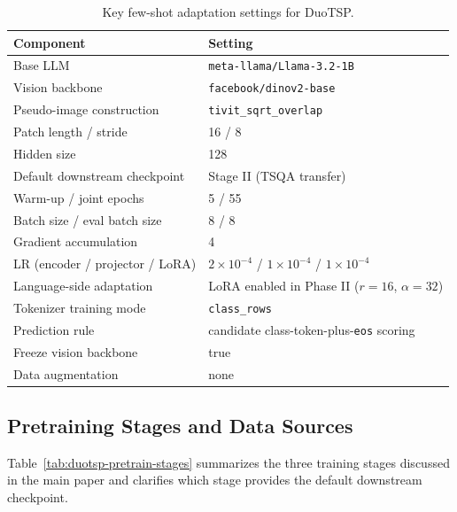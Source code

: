 \documentclass{article}
\begin{document}
\begin{table}[t]
\centering
\caption{Key few-shot adaptation settings for DuoTSP.}
\label{tab:duotsp-appendix-details}
\begin{tabular}{ll}
\toprule
Component & Setting \\
\midrule
Base LLM & \texttt{meta-llama/Llama-3.2-1B} \\
Vision backbone & \texttt{facebook/dinov2-base} \\
Pseudo-image construction & \texttt{tivit\_sqrt\_overlap} \\
Patch length / stride & 16 / 8 \\
Hidden size & 128 \\
Default downstream checkpoint & Stage II (TSQA transfer) \\
Warm-up / joint epochs & 5 / 55 \\
Batch size / eval batch size & 8 / 8 \\
Gradient accumulation & 4 \\
LR (encoder / projector / LoRA) & $2\times 10^{-4}$ / $1\times 10^{-4}$ / $1\times 10^{-4}$ \\
Language-side adaptation & LoRA enabled in Phase II ($r=16$, $\alpha=32$) \\
Tokenizer training mode & \texttt{class\_rows} \\
Prediction rule & candidate class-token-plus-\texttt{eos} scoring \\
Freeze vision backbone & true \\
Data augmentation & none \\
\bottomrule
\end{tabular}
\end{table}

\subsection{Pretraining Stages and Data Sources}
\label{app:pretrain-details}

Table~\ref{tab:duotsp-pretrain-stages} summarizes the three training stages discussed in the main paper and clarifies which stage provides the default downstream checkpoint.
\end{document}
